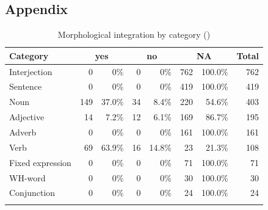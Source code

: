 \documentclass[output=paper]{langscibook}
\begin{document}
\sloppy\printbibliography[heading=subbibliography,notkeyword=this]
\begin{paperappendix}
\section*{Appendix}
\begin{table}
\caption{\label{tab:vihmanetal:a1}Orthographic integration by category ()}
\end{table}

\begin{table}
\caption{\label{tab:vihmanetal:a2}Morphological integration by category ()}
\begin{tabularx}{\textwidth}{X r@{~~}r r@{~~}r r@{~~}r r}
\lsptoprule
 Category & \multicolumn{2}{c}{yes} & \multicolumn{2}{c}{no}  & \multicolumn{2}{c}{NA} & Total \\
 \midrule
 Interjection & 0 &0\%& 0 &0\%& 762 &100.0\%& 762 \\
 Sentence & 0 &0\%& 0 &0\%& 419 &100.0\%& 419\\
 Noun & 149 &37.0\%& 34 &8.4\%& 220 &54.6\%& 403 \\
 Adjective & 14 &7.2\%& 12 &6.1\%& 169 &86.7\%& 195 \\
 Adverb & 0 &0\%& 0 &0\%& 161 &100.0\%& 161 \\
 Verb & 69 &63.9\%& 16 &14.8\%& 23 &21.3\%& 108 \\
 Fixed expression & 0 &0\%& 0 &0\%& 71 &100.0\%& 71 \\
 WH-word & 0 &0\%& 0 &0\%& 30 &100.0\%& 30 \\
 Conjunction & 0 &0\%& 0 &0\%& 24 &100.0\%& 24 \\
 \lspbottomrule
\end{tabularx}
\end{table}
\end{paperappendix}
\end{document}
